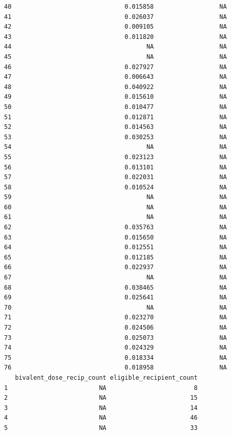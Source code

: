 \documentclass[
  letterpaper,
  DIV=11,
  numbers=noendperiod]{scrartcl}
\begin{document}
\begin{verbatim}
40                               0.015858                  NA
41                               0.026037                  NA
42                               0.009105                  NA
43                               0.011820                  NA
44                                     NA                  NA
45                                     NA                  NA
46                               0.027927                  NA
47                               0.006643                  NA
48                               0.040922                  NA
49                               0.015610                  NA
50                               0.010477                  NA
51                               0.012871                  NA
52                               0.014563                  NA
53                               0.030253                  NA
54                                     NA                  NA
55                               0.023123                  NA
56                               0.013101                  NA
57                               0.022031                  NA
58                               0.010524                  NA
59                                     NA                  NA
60                                     NA                  NA
61                                     NA                  NA
62                               0.035763                  NA
63                               0.015650                  NA
64                               0.012551                  NA
65                               0.012185                  NA
66                               0.022937                  NA
67                                     NA                  NA
68                               0.038465                  NA
69                               0.025641                  NA
70                                     NA                  NA
71                               0.023270                  NA
72                               0.024506                  NA
73                               0.025073                  NA
74                               0.024329                  NA
75                               0.018334                  NA
76                               0.018958                  NA
   bivalent_dose_recip_count eligible_recipient_count
1                         NA                        8
2                         NA                       15
3                         NA                       14
4                         NA                       46
5                         NA                       33

\end{verbatim}
\end{document}
